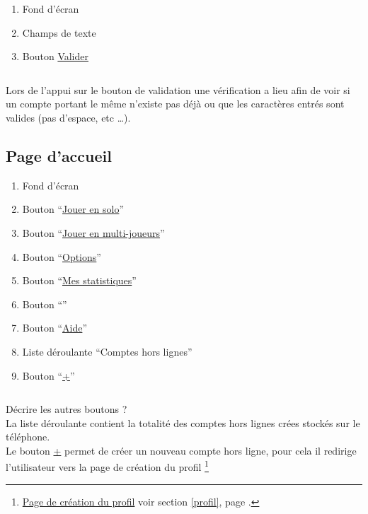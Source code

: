\documentclass{report}
\begin{document}
		\begin{enumerate}
		  \item Fond d'écran
		  \item Champs de texte
		  \item Bouton \hyperlink{Page d'accueil}{Valider}
		\end{enumerate}
			
		$\,$
		
		Lors de l'appui sur le bouton de validation une vérification a lieu afin de
		voir si un compte portant le même n'existe pas déjà ou que les caractères
		entrés sont valides (pas d'espace, etc \ldots). \\		
		
		$\,$
	
\newpage

	\subsection{Page d'accueil}
		\hypertarget{Page d'accueil}{}
		\label{accueil}
	
		
		
		\begin{enumerate}
		  \item Fond d'écran
		  \item Bouton ``\hyperlink{Creer partie solo}{Jouer en solo}''
		  \item Bouton ``\hyperlink{Connexion multi-joueurs}{Jouer en multi-joueurs}''
		  \item Bouton ``\hyperlink{Options}{Options}''
		  \item Bouton ``\hyperlink{Statistiques}{Mes statistiques}''
		  \item Bouton ``''
		  \item Bouton ``\hyperlink{Aide}{Aide}''
		  \item Liste déroulante ``Comptes hors lignes''
		  \item Bouton ``\hyperlink{Création du profil}{+}'' 
		\end{enumerate}
		
		$\,$
		
		Décrire les autres boutons ? \\		
		La liste déroulante contient la totalité des comptes hors lignes crées stockés
		sur le téléphone. \\
		Le bouton \hyperlink{Création du profil}{+} permet de créer un nouveau compte
		hors ligne, pour cela il redirige l'utilisateur vers la page de création du profil%
		\footnote[1]{
			\hyperlink{Création du profil}{Page de création du profil}
			\og voir section \ref{profil}, page \pageref{profil}.\fg
		}
		
\end{document}
